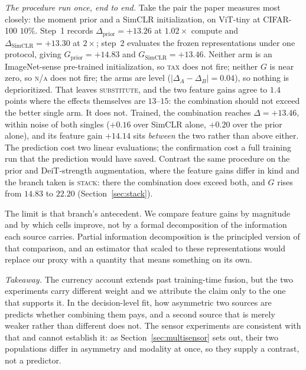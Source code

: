 \emph{The procedure run once, end to end.}  Take the pair the paper measures
most closely: the moment prior and a SimCLR initialization, on ViT-tiny at
CIFAR-100 $10\%$. Step~1 records
$\Delta_{\mathrm{prior}} = +13.26$ at $1.02\times$ compute and
$\Delta_{\mathrm{SimCLR}} = +13.30$ at $2\times$; step~2 evaluates the frozen
representations under one protocol, giving $G_{\mathrm{prior}} = +14.83$ and
$G_{\mathrm{SimCLR}} = +13.46$. Neither arm is an ImageNet-sense pre-trained
initialization, so \textsc{tax} does not fire; neither $G$ is near zero, so
\textsc{n/a} does not fire; the arms are level ($|\Delta_A - \Delta_B| = 0.04$),
so nothing is deprioritized. That leaves \textsc{substitute}, and the two
feature gains agree to $1.4$ points where the effects themselves are
$13$--$15$: the combination should not exceed the better single arm.
It does not. Trained, the combination reaches $\Delta = +13.46$, within noise
of both singles ($+0.16$ over SimCLR alone, $+0.20$ over the prior alone), and
its feature gain $+14.14$ sits \emph{between} the two rather than above
either. The prediction cost two linear evaluations; the confirmation cost a
full training run that the prediction would have saved. Contrast the same
procedure on the prior and DeiT-strength augmentation, where the feature
gains differ in kind and the branch taken is \textsc{stack}: there the
combination does exceed both, and $G$ rises from $14.83$ to $22.20$
(Section~\ref{sec:stack}).

The limit is that branch's antecedent. We compare feature gains by
magnitude and by which cells improve, not by a formal decomposition of the
information each source carries. Partial information decomposition
\citep{williams2010nonnegative,liang2023quantifying} is the principled
version of that comparison, and an estimator that scaled to these
representations would replace our proxy with a quantity that means
something on its own.

\emph{Takeaway.} The currency account extends past training-time fusion, but
the two experiments carry different weight and we attribute the claim only to
the one that supports it. In the decision-level fit, how asymmetric two sources
are predicts whether combining them pays, and a second source that is merely
weaker rather than different does not. The sensor experiments are consistent
with that and cannot establish it: as Section~\ref{sec:multisensor} sets out,
their two populations differ in asymmetry and modality at once, so they supply a contrast, not a predictor.

